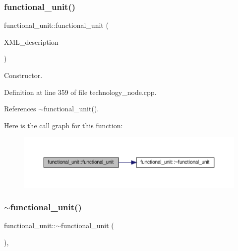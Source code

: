 \mbox{\label{structfunctional__unit_a803b16c20f69a433188d018cad20fff3}} 
\subsubsection{\texorpdfstring{functional\+\_\+unit()}{functional\_unit()}\hspace{0.1cm}{\footnotesize\ttfamily [2/2]}}
{\footnotesize\ttfamily functional\+\_\+unit\+::functional\+\_\+unit (\begin{DoxyParamCaption}\item[{const xml\+\_\+node\+Ref}]{X\+M\+L\+\_\+description }\end{DoxyParamCaption})\hspace{0.3cm}{\ttfamily [explicit]}}



Constructor. 



Definition at line 359 of file technology\+\_\+node.\+cpp.



References $\sim$functional\+\_\+unit().

Here is the call graph for this function\+:
\nopagebreak
\begin{figure}[H]
\begin{center}
\leavevmode
\includegraphics[width=350pt]{d8/dd6/structfunctional__unit_a803b16c20f69a433188d018cad20fff3_cgraph}
\end{center}
\end{figure}
\mbox{\label{structfunctional__unit_a356a9b93866182523e867b92e8a2ffd6}} 
\subsubsection{\texorpdfstring{$\sim$functional\+\_\+unit()}{~functional\_unit()}}
{\footnotesize\ttfamily functional\+\_\+unit\+::$\sim$functional\+\_\+unit (\begin{DoxyParamCaption}{ }\end{DoxyParamCaption})\hspace{0.3cm}{\ttfamily [override]}, {\ttfamily [default]}}



